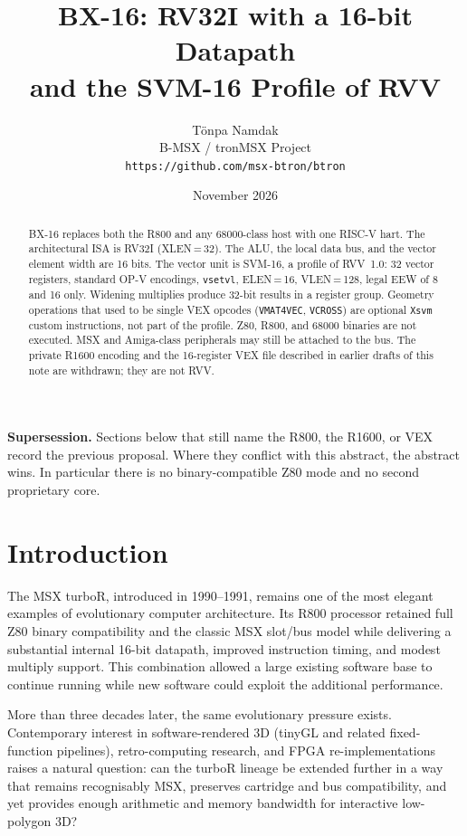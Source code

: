 \documentclass[11pt,a4paper]{article}
\title{
BX-16: RV32I with a 16-bit Datapath\\
and the SVM-16 Profile of RVV
}
\author{
T\"onpa Namdak\\
B-MSX / tronMSX Project\\
\texttt{https://github.com/msx-btron/btron}
}
\date{November 2026}
\begin{document}
\maketitle

\begin{abstract}
BX-16 replaces both the R800 and any 68000-class host with one RISC-V hart. The architectural ISA is RV32I (XLEN\,=\,32). The ALU, the local data bus, and the vector element width are 16 bits. The vector unit is SVM-16, a profile of RVV~1.0: 32 vector registers, standard OP-V encodings, \texttt{vsetvl}, ELEN\,=\,16, VLEN\,=\,128, legal EEW of 8 and 16 only. Widening multiplies produce 32-bit results in a register group. Geometry operations that used to be single VEX opcodes (\texttt{VMAT4VEC}, \texttt{VCROSS}) are optional \texttt{Xsvm} custom instructions, not part of the profile. Z80, R800, and 68000 binaries are not executed. MSX and Amiga-class peripherals may still be attached to the bus. The private R1600 encoding and the 16-register VEX file described in earlier drafts of this note are withdrawn; they are not RVV.
\end{abstract}

\noindent\textbf{Supersession.} Sections below that still name the R800, the R1600, or VEX record the previous proposal. Where they conflict with this abstract, the abstract wins. In particular there is no binary-compatible Z80 mode and no second proprietary core.

\tableofcontents
\newpage

\section{Introduction}

The MSX turboR, introduced in 1990--1991, remains one of the most elegant examples of evolutionary computer architecture. Its R800 processor retained full Z80 binary compatibility and the classic MSX slot/bus model while delivering a substantial internal 16-bit datapath, improved instruction timing, and modest multiply support. This combination allowed a large existing software base to continue running while new software could exploit the additional performance.

More than three decades later, the same evolutionary pressure exists. Contemporary interest in software-rendered 3D (tinyGL and related fixed-function pipelines), retro-computing research, and FPGA re-implementations raises a natural question: can the turboR lineage be extended further in a way that remains recognisably MSX, preserves cartridge and bus compatibility, and yet provides enough arithmetic and memory bandwidth for interactive low-polygon 3D?
\end{document}
